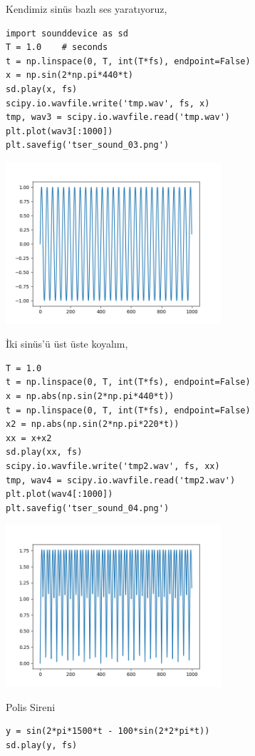 \documentclass[12pt,fleqn]{article}\usepackage{../../common}
\begin{document}
Kendimiz sinüs bazlı ses yaratıyoruz,

\begin{verbatim}
import sounddevice as sd
T = 1.0    # seconds
t = np.linspace(0, T, int(T*fs), endpoint=False) 
x = np.sin(2*np.pi*440*t)
sd.play(x, fs)
scipy.io.wavfile.write('tmp.wav', fs, x)
tmp, wav3 = scipy.io.wavfile.read('tmp.wav')
plt.plot(wav3[:1000])
plt.savefig('tser_sound_03.png')
\end{verbatim}

\includegraphics[height=6cm]{tser_sound_03.png}

İki sinüs'ü üst üste koyalım,

\begin{verbatim}
T = 1.0  
t = np.linspace(0, T, int(T*fs), endpoint=False) 
x = np.abs(np.sin(2*np.pi*440*t))
t = np.linspace(0, T, int(T*fs), endpoint=False) 
x2 = np.abs(np.sin(2*np.pi*220*t))
xx = x+x2
sd.play(xx, fs)
scipy.io.wavfile.write('tmp2.wav', fs, xx)
tmp, wav4 = scipy.io.wavfile.read('tmp2.wav')
plt.plot(wav4[:1000])
plt.savefig('tser_sound_04.png')
\end{verbatim}

\includegraphics[height=6cm]{tser_sound_04.png}

Polis Sireni

\begin{verbatim}
y = sin(2*pi*1500*t - 100*sin(2*2*pi*t))
sd.play(y, fs)
\end{verbatim}
\end{document}
